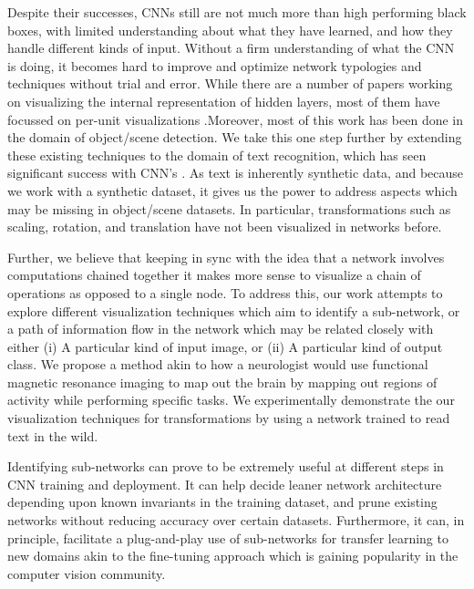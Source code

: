 \documentclass[10pt,twocolumn,letterpaper]{article}
\begin{document}
Despite their successes, CNNs still are not much more than high performing black boxes, with limited understanding about what they have learned, and how they handle different kinds of input. Without a firm understanding of what the CNN is doing, it becomes hard to improve and optimize network typologies and techniques without trial and error. While there are a number of papers working on visualizing the internal representation of hidden layers, most of them have focussed on per-unit visualizations \cite{yosinski2015understanding,mahendran2015understanding,zhou2014object}.Moreover, most of this work has been done in the domain of object/scene detection. We take this one step further by extending these existing techniques to the domain of text recognition, which has seen significant success with CNN's \cite{Jaderberg14,Jaderberg14c,Jaderberg14d}. As text is inherently synthetic data, and because we work with a synthetic dataset, it gives us the power to address aspects which may be missing in object/scene datasets. In particular, transformations such as scaling, rotation, and translation have not been visualized in networks before. 

Further, we believe that keeping in sync with the idea that a network involves computations chained together it makes more sense to visualize a chain of operations as opposed to a single node. To address this, our work attempts to  explore different visualization techniques which aim to identify a sub-network, or a path of information flow in the network which may be related closely with either (i) A particular kind of input image, or (ii) A particular kind of output class. We propose a method akin to how a neurologist would use functional magnetic resonance imaging to map out the brain by mapping out regions of activity while performing specific tasks.\cite{friston1998event} We experimentally demonstrate the our visualization techniques for transformations by using a network trained to read text in the wild. 

Identifying sub-networks can prove to be extremely useful at different steps in CNN training and deployment. It can help decide leaner network architecture depending upon known invariants in the training dataset, and prune existing networks without reducing accuracy over certain datasets. Furthermore, it can, in principle, facilitate a plug-and-play use of sub-networks for transfer learning to new domains akin to the fine-tuning approach which is gaining popularity in the computer vision community. \cite{}
\end{document}
